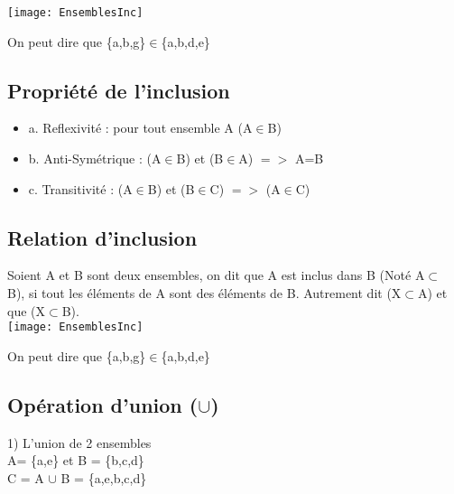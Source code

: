 \texttt{[image: EnsemblesInc]}
\vspace{3mm} %

On peut dire que \{a,b,g\}$\in$\{a,b,d,e\} \\


\subsection{Propriété de l'inclusion}
\vspace{3mm} %

\begin{itemize}
\item {a. Reflexivité : pour tout ensemble A (A$\in$B)}
\item {b. Anti-Symétrique : (A$\in$B) et (B$\in$A) $=>$ A=B}
\item {c. Transitivité : (A$\in$B) et (B$\in$C) $=>$ (A$\in$C)}
\end{itemize}

\newpage

\subsection{Relation d'inclusion}
\vspace{3mm} %

Soient A et B sont deux ensembles, on dit que A est inclus dans B (Noté A$\subset$ B), si tout les éléments de A sont des éléments de B. Autrement dit (X$\subset$A) et que (X$\subset$B).\\

\texttt{[image: EnsemblesInc]}
\vspace{3mm} %

On peut dire que \{a,b,g\}$\in$\{a,b,d,e\} \\

\vspace{3mm} %
\subsection{Opération d'union ($\cup$)}
\vspace{3mm} %

1) L'union de 2 ensembles \\
A= \{a,e\} et B = \{b,c,d\} \\

C = A $\cup$ B = \{a,e,b,c,d\}

\vspace{3mm} %
